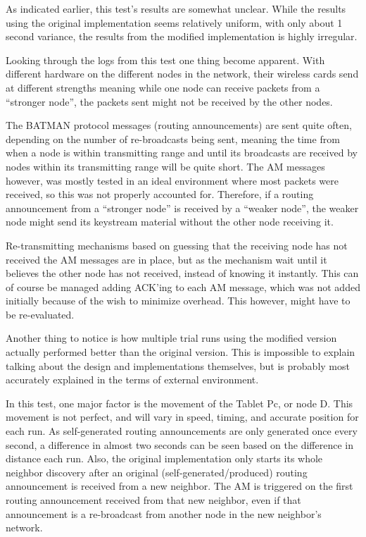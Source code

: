 As indicated earlier, this test's results are somewhat unclear. While the
results using the original implementation seems relatively uniform, with only
about 1 second variance, the results from the modified implementation is highly
irregular.

Looking through the logs from this test one thing become apparent. With
different hardware on the different nodes in the network, their wireless cards
send at different strengths meaning while one node can receive packets from a
``stronger node'', the packets sent might not be received by the other nodes.

The BATMAN protocol messages (routing announcements) are sent quite often,
depending on the number of re-broadcasts being sent, meaning the time from when
a node is within transmitting range and until its broadcasts are received by
nodes within its transmitting range will be quite short. The \ac{AM} messages
however, was mostly tested in an ideal environment where most packets were
received, so this was not properly accounted for. Therefore, if a routing
announcement from a ``stronger node'' is received by a ``weaker node'', the
weaker node might send its keystream material without the other node receiving
it.

Re-transmitting mechanisms based on guessing that the receiving node has not
received the \ac{AM} messages are in place, but as the mechanism wait until it
believes the other node has not received, instead of knowing it instantly. This
can of course be managed adding ACK'ing to each \ac{AM} message, which was not
added initially because of the wish to minimize overhead. This however, might
have to be re-evaluated.

Another thing to notice is how multiple trial runs using the modified version
actually performed better than the original version. This is impossible to
explain talking about the design and implementations themselves, but is probably
most accurately explained in the terms of external environment.

In this test, one major factor is the movement of the Tablet Pc, or node D. This
movement is not perfect, and will vary in speed, timing, and accurate position
for each run. As self-generated routing announcements are only generated once
every second, a difference in almost two seconds can be seen based on the
difference in distance each run. Also, the original implementation only starts
its whole neighbor discovery after an original (self-generated/produced)
routing announcement is received from a new neighbor. The \ac{AM} is triggered
on the first routing announcement received from that new neighbor, even if that
announcement is a re-broadcast from another node in the new neighbor's network.
